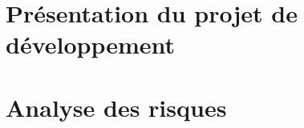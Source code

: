 \documentclass[a4paper,12pt]{report}
\begin{document}




\section{Présentation du projet de développement}
\section{Analyse des risques}
\end{document}
